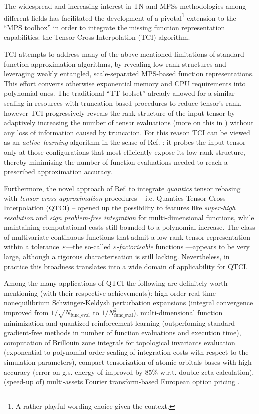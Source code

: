 The widespread and increasing interest in TN and MPSs methodologies among different fields has facilitated the development of a pivotal\footnote{A rather playful wording choice given the context.} extension to the ``MPS toolbox'' in order to integrate the missing function representation capabilities: the Tensor Cross Interpolation (TCI) algorithm.

TCI attempts to address many of the above-mentioned limitations of standard function approximation algorithms, by revealing low-rank structures and leveraging weakly entangled, scale-separated MPS-based function representations. This effort converts otherwise exponential memory and CPU
requirements into polynomial ones. The traditional ``TT-toolset'' already allowed for a similar scaling in resources with truncation-based procedures to reduce tensor's rank, however TCI progressively reveals the rank structure of the input tensor by adaptively increasing the number of tensor evaluations (more on this in ) without any loss of information caused by truncation. For this reason TCI can be viewed as an \emph{active–learning} algorithm in the sense of Ref.
\cite{Settles2012}:  it probes the input tensor only at those configurations that most efficiently expose its low-rank structure, thereby minimising the number of function evaluations needed to reach a prescribed approximation accuracy.

Furthermore, the novel approach of Ref. \cite{Fernandez2022, Fernandez2024} to integrate \textit{quantics} tensor rebasing with \textit{tensor cross approximation} procedures -- i.e. Quantics Tensor Cross Interpolation (QTCI) -- opened up the possibility to features like \textit{super-high resolution} and \textit{sign problem-free integration} for multi-dimensional functions, while maintaining computational costs still bounded to a polynomial increase. The class of multivariate continuous functions that admit a low-rank tensor representation within a tolerance~$\varepsilon$—the so-called \emph{$\varepsilon$-factorisable} functions \cite{Fernandez2022}—appears to be very large, although a rigorous characterisation is still lacking. Nevertheless, in practice this broadness translates into a wide domain of applicability for QTCI. 

Among the many applications of QTCI the following are definitely worth mentioning (with their respective achievements): high-order real-time nonequilibrium Schwinger-Keldysh perturbation expansions \cite{Fernandez2022} (integral convergence improved from $1/\sqrt{N_{\text{func\_eval}}}$ to $1/N_{\text{func\_eval}}^2$), multi-dimensional function minimization and quantized reinforcement learning \cite{Sozykin2022} (outperfoming standard gradient-free methods in number of function evaluations and execution time), computation of Brillouin zone integrals for topological invariants evaluation \cite{Ritter2024} (exponential to polynomial-order scaling of integration costs with respect to the simulation parameters), compact tensorization of atomic orbitals bases with high accuracy \cite{Jolly2024} (error on g.s. energy of  improved by 85\% w.r.t. double zeta calculation), (speed-up of) multi-assets Fourier transform-based European option pricing \cite{Sakurai2025}.

